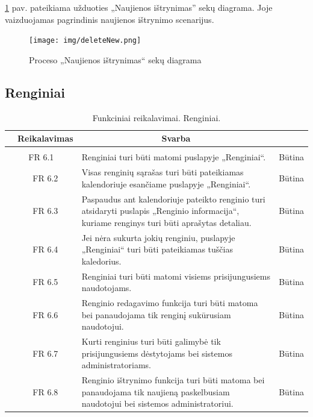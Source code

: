 \documentclass{VUMIFPSkursinis}
\begin{document}
\ref{fig:delnews} pav. pateikiama užduoties „Naujienos ištrynimas” sekų diagrama. Joje vaizduojamas pagrindinis
naujienos ištrynimo scenarijus.
\begin{figure}[H]
	\centering
	\texttt{[image: img/deleteNew.png]}
	\caption{Proceso „Naujienos ištrynimas“ sekų diagrama}
	\label{fig:delnews}
\end{figure}

\subsection{Renginiai}

\begin{table}[H]
	\caption{Funkciniai reikalavimai. Renginiai.}
	\begin{tabular}{|p{1cm}|p{1cm}|p{}|p{}|}
		\hline 
		\rowcolor{gray!50}
		\multicolumn{2}{|c|}{{\bfseries Kodas}}&
		\multicolumn{1}{c|}{{\bfseries Reikalavimas}}&
		\multicolumn{1}{c|}{{\bfseries Svarba}}\\
		\hline
		\rowcolor{lightgray}
		\multicolumn{4}{|c|}{Renginiai}\\		
		
		\hline
		\multicolumn{2}{|c|}{FR 6.1}&
		{Renginiai turi būti matomi puslapyje „Renginiai“.
		}&		
		\multicolumn{1}{c|}{Būtina}\\
		\hline
		\multicolumn{1}{|c}{}&
		\multicolumn{1}{c|}{FR 6.2}&
		{Visas renginių sąrašas turi būti pateikiamas kalendoriuje esančiame puslapyje „Renginiai“.
		}&		
		\multicolumn{1}{c|}{Būtina}\\
		\hline
		\multicolumn{1}{|c}{}&
		\multicolumn{1}{c|}{FR 6.3}&
		{Paspaudus ant kalendoriuje pateikto renginio turi atsidaryti puslapis „Renginio informacija“, kuriame renginys turi būti aprašytas detaliau.
		}&
		\multicolumn{1}{c|}{Būtina}\\	
		\hline		
		\multicolumn{1}{|c}{}&
		\multicolumn{1}{c|}{FR 6.4}&
		{Jei nėra sukurta jokių renginiu, puslapyje „Renginiai“ turi būti pateikiamas tuščias kaledorius.
		}&
		\multicolumn{1}{c|}{Būtina}\\									
		\hline
		\multicolumn{1}{|c}{}&
		\multicolumn{1}{c|}{FR 6.5}&
		{Renginiai turi būti matomi visiems prisijungusiems naudotojams.
		}&
		\multicolumn{1}{c|}{Būtina}\\	
		\hline		
		\multicolumn{1}{|c}{}&
		\multicolumn{1}{c|}{FR 6.6}&
		{Renginio redagavimo funkcija turi būti matoma bei panaudojama tik renginį sukūrusiam naudotojui.
		}&
		\multicolumn{1}{c|}{Būtina}\\									
		\hline
		\multicolumn{1}{|c}{}&
		\multicolumn{1}{c|}{FR 6.7}&
		{Kurti renginius turi būti galimybė tik prisijungusiems dėstytojams bei sistemos administratoriams.
		}&
		\multicolumn{1}{c|}{Būtina}\\	
		\hline		
		\multicolumn{1}{|c}{}&
		\multicolumn{1}{c|}{FR 6.8}&
		{Renginio ištrynimo funkcija turi būti matoma bei panaudojama tik naujieną paskelbusiam naudotojui bei sistemos administratoriui.
		}&
		\multicolumn{1}{c|}{Būtina}\\									
		\hline
	\end{tabular}		
\end{table}
\end{document}
